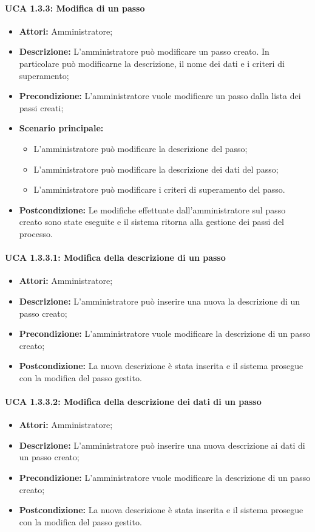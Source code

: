 \paragraph{UCA 1.3.3: Modifica di un passo}
\begin{itemize}
\item \textbf{Attori:}
 Amministratore;
\item \textbf{Descrizione:} 
L'amministratore può modificare un passo creato. In particolare può modificarne la descrizione, il nome dei dati e i criteri di superamento; 
\item \textbf{Precondizione:}
 L'amministratore vuole modificare un passo dalla lista dei passi creati;
\item \textbf{Scenario principale:} 
\begin{itemize}
\item L'amministratore può modificare la descrizione del passo;
\item L'amministratore può modificare la descrizione dei dati del passo;
\item L'amministratore può modificare i criteri di superamento del passo.
\end{itemize}
\item \textbf{Postcondizione:}
 Le modifiche effettuate dall'amministratore sul passo creato sono state eseguite e il sistema ritorna alla gestione dei passi del processo. 
\end{itemize}

\paragraph{UCA 1.3.3.1: Modifica della descrizione di un passo}

\begin{itemize}
\item \textbf{Attori:}
 Amministratore;
\item \textbf{Descrizione:}
 L'amministratore può inserire una nuova la descrizione di un passo creato;
\item \textbf{Precondizione:} 
L'amministratore vuole modificare la descrizione di un passo creato;
\item \textbf{Postcondizione:}
 La nuova descrizione è stata inserita e il sistema prosegue con la modifica del passo gestito.
\end{itemize}

\paragraph{UCA 1.3.3.2: Modifica della descrizione dei dati di un passo}
\begin{itemize}
\item \textbf{Attori:}
 Amministratore;
\item \textbf{Descrizione:}
 L'amministratore può inserire una nuova descrizione ai dati di un passo creato;
\item \textbf{Precondizione:} 
L'amministratore vuole modificare la descrizione di un passo creato;
\item \textbf{Postcondizione:}
 La nuova descrizione è stata inserita e il sistema prosegue con la modifica del passo gestito.
\end{itemize}

